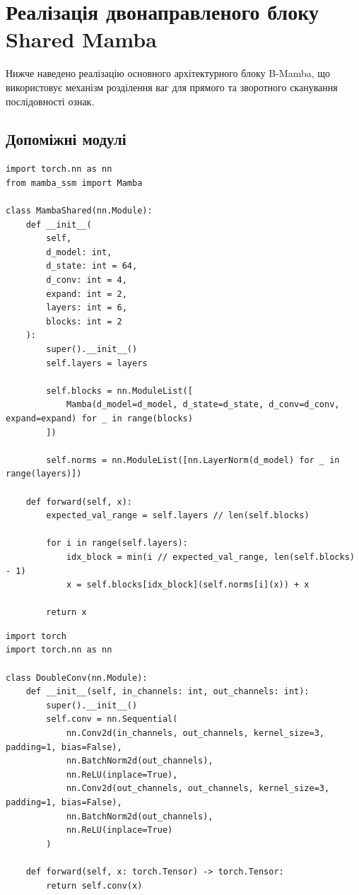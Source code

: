 \section{Реалізація двонаправленого блоку Shared Mamba}

Нижче наведено реалізацію основного архітектурного блоку B-Mamba, що використовує механізм розділення ваг для прямого та зворотного сканування послідовності ознак.
\subsection{Допоміжні модулі}

\begin{lstlisting}[caption={Клас модуля Shared Mamba (PyTorch)}]
import torch.nn as nn
from mamba_ssm import Mamba

class MambaShared(nn.Module):
    def __init__(
        self,
        d_model: int,
        d_state: int = 64,
        d_conv: int = 4,
        expand: int = 2,
        layers: int = 6,
        blocks: int = 2
    ):
        super().__init__()
        self.layers = layers

        self.blocks = nn.ModuleList([
            Mamba(d_model=d_model, d_state=d_state, d_conv=d_conv, expand=expand) for _ in range(blocks)
        ])

        self.norms = nn.ModuleList([nn.LayerNorm(d_model) for _ in range(layers)])

    def forward(self, x):
        expected_val_range = self.layers // len(self.blocks)

        for i in range(self.layers):
            idx_block = min(i // expected_val_range, len(self.blocks) - 1)
            x = self.blocks[idx_block](self.norms[i](x)) + x

        return x
\end{lstlisting}

\begin{lstlisting}[caption={Клас модуля DoubleConv (PyTorch)}]
import torch
import torch.nn as nn

class DoubleConv(nn.Module):
    def __init__(self, in_channels: int, out_channels: int):
        super().__init__()
        self.conv = nn.Sequential(
            nn.Conv2d(in_channels, out_channels, kernel_size=3, padding=1, bias=False),
            nn.BatchNorm2d(out_channels),
            nn.ReLU(inplace=True),
            nn.Conv2d(out_channels, out_channels, kernel_size=3, padding=1, bias=False),
            nn.BatchNorm2d(out_channels),
            nn.ReLU(inplace=True)
        )

    def forward(self, x: torch.Tensor) -> torch.Tensor:
        return self.conv(x)
\end{lstlisting}

